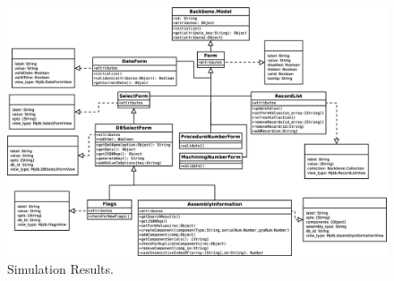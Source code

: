\documentclass[journal]{IEEEtran}
\begin{document}
\begin{figure}[!p]
\centering
\includegraphics[width=7.5in]{Models}
\caption{Simulation Results.}
\label{models}
\end{figure}

\clearpage

%
%

\end{document}
